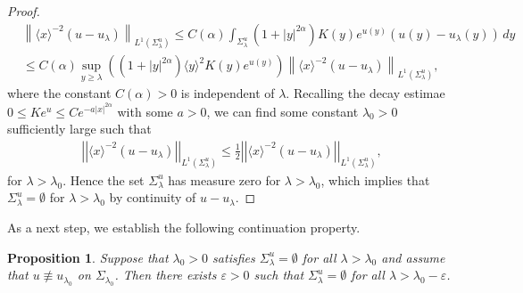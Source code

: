 \documentclass[reqno,10pt,a4paper]{amsart}
\newtheorem{prop}{Proposition}[section]
\theoremstyle{definition}
\theoremstyle{definition}
\theoremstyle{remark}
\theoremstyle{remark}
\numberwithin{equation}{section}
\newcommand{\eps}{\varepsilon}
\begin{document}
\begin{appendix}
\begin{proof}
    \begin{align*}
        &\left \| \langle x\rangle^{-2}(u-u_\lambda)\right \|_{L^1(\Sigma_\lambda^u)} \leq C(\alpha) \int_{\Sigma_\lambda^u} \left(1 + |y|^{2 \alpha}\right) K(y) e^{u(y)}(u(y)-u_\lambda(y)) \, dy \\
        &\leq C(\alpha) \sup_{y\geq \lambda} \left(\left(1 + |y|^{2 \alpha}\right) \langle y\rangle^2 K(y) e^{u(y)}\right) \left \|\langle x\rangle^{-2}(u-u_\lambda)\right \|_{L^1(\Sigma_\lambda^u)},
    \end{align*}
    where the constant $C(\alpha)>0$ is independent of $\lambda$. Recalling the decay estimae $0 \leq K e^u \leq C e^{-a |x|^{2 \alpha}}$ with some $a > 0$, we can find some constant $\lambda_0 > 0$ sufficiently large such that \begin{align*}
        \left|\left|\langle x\rangle^{-2}(u-u_\lambda)\right|\right|_{L^1(\Sigma_\lambda^u)} \leq \frac{1}{2} \left|\left|\langle x\rangle^{-2}(u-u_\lambda)\right|\right|_{L^1(\Sigma_\lambda^u)},
    \end{align*}
    for $\lambda > \lambda_0$. Hence the set $\Sigma^u_\lambda$ has measure zero for $\lambda > \lambda_0$, which implies that $\Sigma_\lambda^u= \emptyset$ for $\lambda> \lambda_0$ by continuity of $u-u_\lambda$.
    \end{proof}
    
    
As a next step, we establish the following continuation property.

\begin{prop} \label{prop:movingplane2}
    Suppose that $\lambda_0 > 0$ satisfies $\Sigma_\lambda^u = \emptyset$ for all $\lambda > \lambda_0$ and assume that $u \not\equiv u_{\lambda_0}$ on $\Sigma_{\lambda_0}$. Then there exists $\eps > 0$ such that $\Sigma_\lambda^u = \emptyset$ for all $\lambda > \lambda_0 - \eps$.
\end{prop}


\end{appendix}
\end{document}
